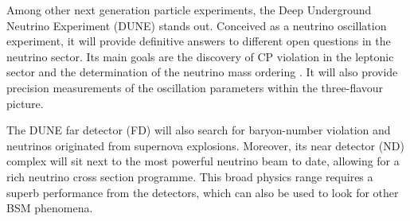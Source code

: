 Among other next generation particle experiments, the Deep Underground Neutrino Experiment (DUNE) stands out. Conceived as a neutrino oscillation experiment, it will provide definitive answers to different open questions in the neutrino sector. Its main goals are the discovery of CP violation in the leptonic sector and the determination of the neutrino mass ordering \cite{DUNE2020TDR1}. It will also provide precision measurements of the oscillation parameters within the three-flavour picture.

The DUNE far detector (FD) will also search for baryon-number violation and neutrinos originated from supernova explosions. Moreover, its near detector (ND) complex will sit next to the most powerful neutrino beam to date, allowing for a rich neutrino cross section programme. This broad physics range requires a superb performance from the detectors, which can also be used to look for other BSM phenomena.

\begin{comment}
In this thesis, I explore three different aspects of DUNE. Focusing on the data acquisition system of the far detector, I start by proposing a method to enhance the sensitivity of the online processing to low energy events. The idea is to modify the processing chain in order to have more information available to form trigger decisions. I motivate this new approach using both ProtoDUNE data and Monte Carlo (MC) samples, as well as with the results from a test in a real detector setup.

Then, I investigate the potential of detecting neutrino fluxes from DM annihilations inside the Sun with DUNE. Although this is the territory of the large volume neutrino telescopes, a detector with the high resolution and pointing capabilities of the DUNE FD can provide complementary information in certain regimes. I present here the results of a preliminary analysis, showing the projected sensitivities for the general case and two particular DM scenarios.

Finally, I discuss my work on the reconstruction of ND-GAr, the gaseous argon component of the DUNE ND. These efforts were focused towards the development of the particle identification strategy in the detector. Following a series of additions and upgrades in the reconstruction, I make use of that to perform the first event selection studies with fully reconstructed events in this detector.
\end{comment}

